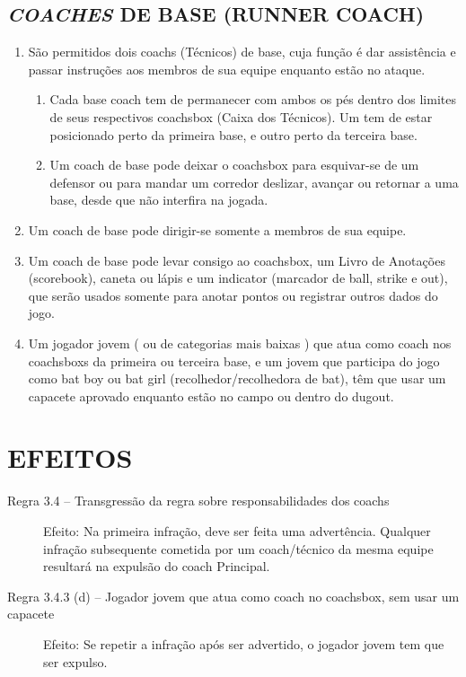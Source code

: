 \subsection{\textit{COACHES} DE BASE (RUNNER COACH)}

\begin{enumerate}[label=(\alph*)]\item   São permitidos dois \glspl{coach} (Técnicos) de base, cuja função é dar assistência e passar instruções aos membros de sua equipe enquanto estão no ataque.
	 \begin{enumerate}[label=\roman*.]
		\item Cada \gls{base coach} tem de permanecer com ambos os pés dentro dos limites de seus respectivos \gls{coachsbox} (Caixa dos Técnicos). Um tem de estar posicionado perto da primeira base, e outro perto da terceira base.
		\item Um \gls{coach} de base pode deixar o \gls{coachsbox} para esquivar-se de um defensor ou para mandar um corredor deslizar, avançar ou retornar a uma base, desde que não interfira na jogada.
	\end{enumerate}
	\item Um \gls{coach} de base pode dirigir-se somente a membros de sua equipe.
	\item Um \gls{coach} de base pode levar consigo ao \gls{coachsbox}, um Livro de Anotações (\gls{scorebook}), caneta ou lápis e um \gls{indicator} (marcador de \gls{ball}, \gls{strike} e \gls{out}), que serão usados somente para anotar pontos ou registrar outros dados do jogo.
	\item Um jogador jovem ( ou de categorias mais baixas ) que atua como \gls{coach} nos \glspl{coachsbox} da primeira ou terceira base, e um jovem que participa do jogo como \gls{bat boy} ou \gls{bat girl} (recolhedor/recolhedora de \gls{bat}), têm que usar um capacete aprovado enquanto estão no campo ou dentro do \gls{dugout}.
\end{enumerate}

\section*{EFEITOS}

\begin{description}
	\item[Regra 3.4 -- Transgressão da regra sobre responsabilidades dos \glspl{coach}]  Efeito:
	Na primeira infração, deve ser feita uma advertência. Qualquer infração subsequente cometida por um \gls{coach}/técnico da mesma equipe resultará na  expulsão do \gls{coach} Principal.
	\item[Regra 3.4.3 (d) -- Jogador jovem que atua como \gls{coach} no \gls{coachsbox}, sem usar um capacete] Efeito: Se repetir a infração após ser advertido, o jogador jovem tem que ser expulso.
\end{description}


